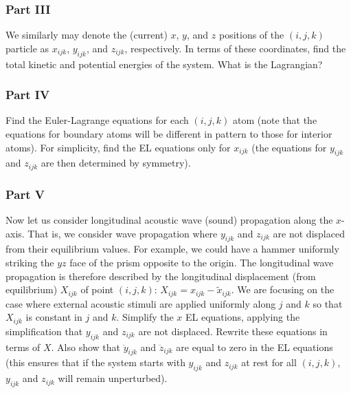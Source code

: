 \documentclass[letterpaper,12pt]{article}
\begin{document}
\begin{flushleft}
    \subsubsection*{Part III}
    We similarly may denote the (current) $x$, $y$, and $z$ positions of the $(i, j, k)$ particle as $x_{ijk}$, $y_{ijk}$, and $z_{ijk}$, respectively. In terms of these coordinates, find the total kinetic and potential energies of the system. What is the Lagrangian?

    \subsubsection*{Part IV}
    Find the Euler-Lagrange equations for each $(i, j, k)$ atom (note that the equations for boundary atoms will be different in pattern to those for interior atoms). For simplicity, find the EL equations only for $x_{ijk}$ (the equations for $y_{ijk}$ and $z_{ijk}$ are then determined by symmetry).

    \subsubsection*{Part V}
    Now let us consider longitudinal acoustic wave (sound) propagation along the $x$-axis. That is, we consider wave propagation where $y_{ijk}$ and $z_{ijk}$ are not displaced from their equilibrium values. For example, we could have a hammer uniformly striking the $yz$ face of the prism opposite to the origin. The longitudinal wave propagation is therefore described by the longitudinal displacement (from equilibrium) $X_{ijk}$ of point $(i, j, k)$: $X_{ijk} = x_{ijk} - \tilde{x}_{ijk}$. We are focusing on the case where external acoustic stimuli are applied uniformly along $j$ and $k$ so that $X_{ijk}$ is constant in $j$ and $k$.\newline\newline
    Simplify the $x$ EL equations, applying the simplification that $y_{ijk}$ and $z_{ijk}$ are not displaced. Rewrite these equations in terms of $X$. Also show that $\ddot{y}_{ijk}$ and $\ddot{z}_{ijk}$ are equal to zero in the EL equations (this ensures that if the system starts with $y_{ijk}$ and $z_{ijk}$ at rest for all $(i, j, k)$, $y_{ijk}$ and $z_{ijk}$ will remain unperturbed).


\end{flushleft}
\end{document}
